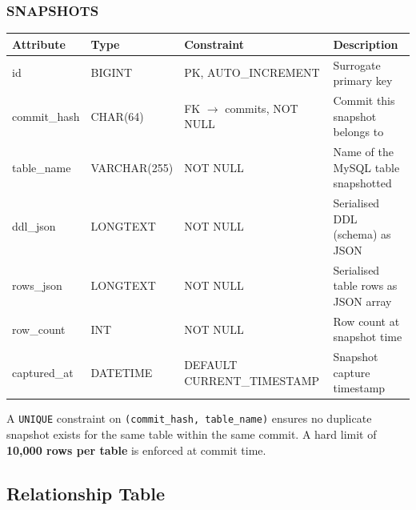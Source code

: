 \documentclass[12pt, a4paper]{article}
\begin{document}
\subsubsection{SNAPSHOTS}

\begin{center}
\renewcommand{\arraystretch}{1.3}
\begin{tabular}{>{\ttfamily}l >{\ttfamily}l l p{4.5cm}}
\toprule
\textbf{Attribute} & \textbf{Type} & \textbf{Constraint} & \textbf{Description} \\
\midrule
id           & BIGINT       & PK, AUTO\_INCREMENT             & Surrogate primary key \\
commit\_hash & CHAR(64)     & FK $\to$ commits, NOT NULL      & Commit this snapshot belongs to \\
table\_name  & VARCHAR(255) & NOT NULL                        & Name of the MySQL table snapshotted \\
ddl\_json    & LONGTEXT     & NOT NULL                        & Serialised DDL (schema) as JSON \\
rows\_json   & LONGTEXT     & NOT NULL                        & Serialised table rows as JSON array \\
row\_count   & INT          & NOT NULL                        & Row count at snapshot time \\
captured\_at & DATETIME     & DEFAULT CURRENT\_TIMESTAMP     & Snapshot capture timestamp \\
\bottomrule
\end{tabular}
\end{center}

A \texttt{UNIQUE} constraint on \texttt{(commit\_hash, table\_name)} ensures no
duplicate snapshot exists for the same table within the same commit. A hard limit
of \textbf{10,000 rows per table} is enforced at commit time.

\subsection{Relationship Table}
\end{document}
